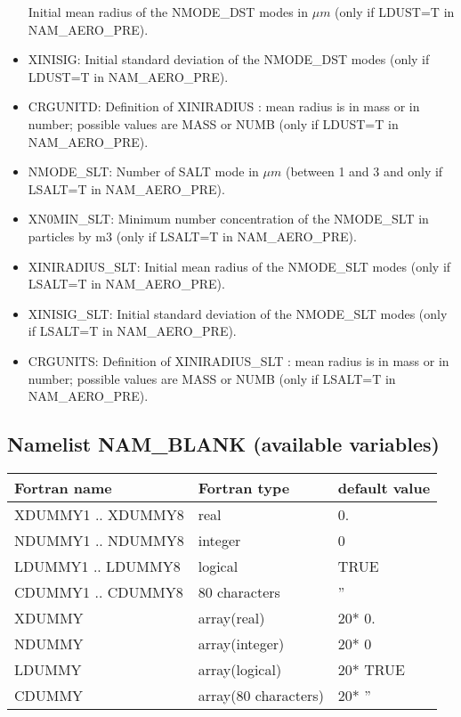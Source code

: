 \begin{itemize}
Initial mean radius of the NMODE\_DST modes in $\mu m$ (only if LDUST=T in NAM\_AERO\_PRE). 
\item XINISIG:
Initial standard deviation of the NMODE\_DST modes (only if LDUST=T in NAM\_AERO\_PRE). 
\item CRGUNITD:
Definition of XINIRADIUS : mean radius is in mass or in number; possible values are MASS or NUMB (only if LDUST=T in NAM\_AERO\_PRE).
\item NMODE\_SLT:
Number of SALT mode in $\mu m$ (between 1 and 3 and only if LSALT=T in NAM\_AERO\_PRE).
\item XN0MIN\_SLT:
Minimum number concentration of the NMODE\_SLT in particles by m3 (only if LSALT=T in NAM\_AERO\_PRE).
\item XINIRADIUS\_SLT:
Initial mean radius of the NMODE\_SLT modes (only if LSALT=T in NAM\_AERO\_PRE).
\item XINISIG\_SLT:
Initial standard deviation of the NMODE\_SLT modes (only if LSALT=T in NAM\_AERO\_PRE).
\item CRGUNITS:
Definition of XINIRADIUS\_SLT : mean radius is in mass or in number; possible values are MASS or NUMB (only if LSALT=T in NAM\_AERO\_PRE).
\end{itemize}


\subsection{Namelist NAM\_BLANK (available variables)} \label{s:namblank}
\begin{center}
\begin{tabular} {|l|l|l|}
\hline
Fortran name & Fortran type & default value \\
\hline
XDUMMY1 .. XDUMMY8 & real                 & 0.       \\
NDUMMY1 .. NDUMMY8 & integer              & 0        \\
LDUMMY1 .. LDUMMY8 & logical              & TRUE     \\
CDUMMY1 .. CDUMMY8 & 80 characters        & ''       \\
XDUMMY             & array(real)          & 20* 0.   \\
NDUMMY             & array(integer)       & 20* 0    \\
LDUMMY             & array(logical)       & 20* TRUE \\
CDUMMY             & array(80 characters) & 20* ''   \\
\hline
\end{tabular}
\end{center}

